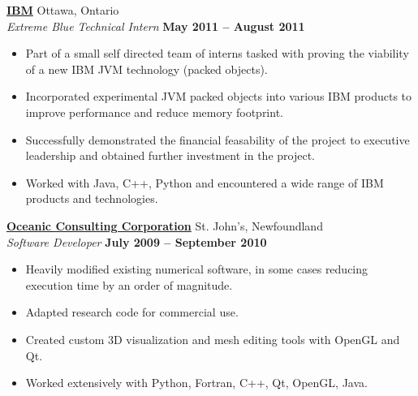 \documentclass[margin,line]{res}
\begin{document}
\begin{resume}
        \href{http://www.ibm.com/ca/en/}{\bf IBM} {\hfill Ottawa, Ontario}\\
      {\em Extreme Blue Technical Intern} \hfill {\bf May 2011 -- August 2011}
      \begin{itemize} \itemsep -2pt
        \item Part of a small self directed team of interns tasked with proving the viability of a new IBM JVM technology (packed objects).
        \item Incorporated experimental JVM packed objects into various IBM products to improve performance and reduce memory footprint.
        \item Successfully demonstrated the financial feasability of the project to executive leadership and obtained further investment in the project.
        \item Worked with Java, C++, Python and encountered a wide range of IBM products and technologies.
      \end{itemize}
    

	\href{http://www.oceaniccorp.com}{\bf Oceanic Consulting Corporation} {\hfill St. John's, Newfoundland}\\
      {\em Software Developer} \hfill {\bf July 2009 -- September 2010}
      \begin{itemize} \itemsep -2pt
        \item Heavily modified existing numerical software, in some cases reducing execution time by an order of magnitude.
        \item Adapted research code for commercial use.
        \item Created custom 3D visualization and mesh editing tools with OpenGL and Qt.
        \item Worked extensively with Python, Fortran, C++, Qt, OpenGL, Java.
      \end{itemize}




\end{resume}
\end{document}
